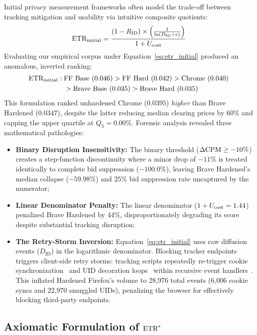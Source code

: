 Initial privacy measurement frameworks often model the trade-off between tracking mitigation and usability via intuitive composite quotients:
\begin{equation}
\text{ETR}_{\text{initial}} = \frac{(1 - R_{\text{ID}}) \times \left( \frac{1}{\ln(D_{\text{ID}} + e)} \right)}{1 + U_{\text{cost}}}
\label{eq:etr_initial}
\end{equation}
Evaluating our empirical corpus under Equation~\ref{eq:etr_initial} produced an anomalous, inverted ranking:
\begin{align*}
\text{ETR}_{\text{initial}}: \; & \text{FF Base (0.046)} > \text{FF Hard (0.042)} > \text{Chrome (0.040)} \\
& > \text{Brave Base (0.035)} > \text{Brave Hard (0.035)}
\end{align*}
This formulation ranked unhardened Chrome ($0.0395$) \textit{higher} than Brave Hardened ($0.0347$), despite the latter reducing median clearing prices by $60\%$ and capping the upper quartile at $Q_3 = 0.00\%$. 
Forensic analysis revealed three mathematical pathologies:
\begin{itemize}
    \item \textbf{Binary Disruption Insensitivity:} The binary threshold ($\Delta\text{CPM} \ge -10\%$) creates a step-function discontinuity where a minor drop of $-11\%$ is treated identically to complete bid suppression ($-100.0\%$), leaving Brave Hardened's median collapse ($-59.98\%$) and $25\%$ bid suppression rate uncaptured by the numerator;
    \item \textbf{Linear Denominator Penalty:} The linear denominator ($1 + U_{\text{cost}} = 1.44$) penalized Brave Hardened by $44\%$, disproportionately degrading its score despite substantial tracking disruption;
    \item \textbf{The Retry-Storm Inversion:} Equation~\ref{eq:etr_initial} uses raw diffusion events ($D_{\text{ID}}$) in the logarithmic denominator. Blocking tracker endpoints triggers client-side retry storms: tracking scripts repeatedly re-trigger cookie synchronization~\cite{papadopoulos2019cookie} and UID decoration loops~\cite{randall2022measuring} within recursive event handlers~\cite{iqbal2020adgraph}. 
    This inflated Hardened Firefox's volume to 28,976 total events (6,006 cookie syncs and 22,970 smuggled UIDs), penalizing the browser for effectively blocking third-party endpoints.
\end{itemize}

\subsection{Axiomatic Formulation of $\text{ETR}^*$}
\label{subsec:etr_star}

